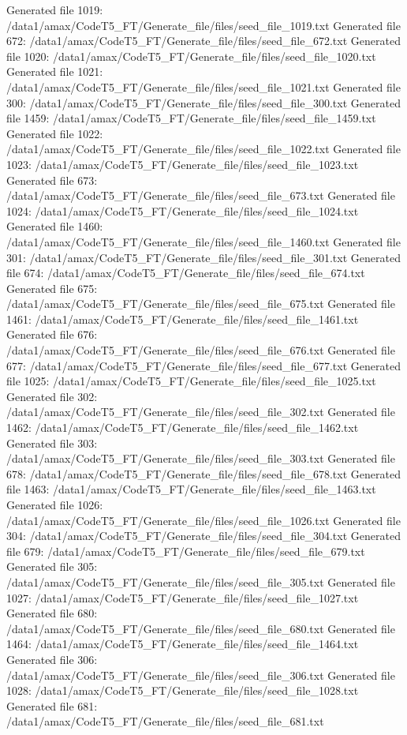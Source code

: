 Generated file 1019: /data1/amax/CodeT5_FT/Generate_file/files/seed_file_1019.txt
Generated file 672: /data1/amax/CodeT5_FT/Generate_file/files/seed_file_672.txt
Generated file 1020: /data1/amax/CodeT5_FT/Generate_file/files/seed_file_1020.txt
Generated file 1021: /data1/amax/CodeT5_FT/Generate_file/files/seed_file_1021.txt
Generated file 300: /data1/amax/CodeT5_FT/Generate_file/files/seed_file_300.txt
Generated file 1459: /data1/amax/CodeT5_FT/Generate_file/files/seed_file_1459.txt
Generated file 1022: /data1/amax/CodeT5_FT/Generate_file/files/seed_file_1022.txt
Generated file 1023: /data1/amax/CodeT5_FT/Generate_file/files/seed_file_1023.txt
Generated file 673: /data1/amax/CodeT5_FT/Generate_file/files/seed_file_673.txt
Generated file 1024: /data1/amax/CodeT5_FT/Generate_file/files/seed_file_1024.txt
Generated file 1460: /data1/amax/CodeT5_FT/Generate_file/files/seed_file_1460.txt
Generated file 301: /data1/amax/CodeT5_FT/Generate_file/files/seed_file_301.txt
Generated file 674: /data1/amax/CodeT5_FT/Generate_file/files/seed_file_674.txt
Generated file 675: /data1/amax/CodeT5_FT/Generate_file/files/seed_file_675.txt
Generated file 1461: /data1/amax/CodeT5_FT/Generate_file/files/seed_file_1461.txt
Generated file 676: /data1/amax/CodeT5_FT/Generate_file/files/seed_file_676.txt
Generated file 677: /data1/amax/CodeT5_FT/Generate_file/files/seed_file_677.txt
Generated file 1025: /data1/amax/CodeT5_FT/Generate_file/files/seed_file_1025.txt
Generated file 302: /data1/amax/CodeT5_FT/Generate_file/files/seed_file_302.txt
Generated file 1462: /data1/amax/CodeT5_FT/Generate_file/files/seed_file_1462.txt
Generated file 303: /data1/amax/CodeT5_FT/Generate_file/files/seed_file_303.txt
Generated file 678: /data1/amax/CodeT5_FT/Generate_file/files/seed_file_678.txt
Generated file 1463: /data1/amax/CodeT5_FT/Generate_file/files/seed_file_1463.txt
Generated file 1026: /data1/amax/CodeT5_FT/Generate_file/files/seed_file_1026.txt
Generated file 304: /data1/amax/CodeT5_FT/Generate_file/files/seed_file_304.txt
Generated file 679: /data1/amax/CodeT5_FT/Generate_file/files/seed_file_679.txt
Generated file 305: /data1/amax/CodeT5_FT/Generate_file/files/seed_file_305.txt
Generated file 1027: /data1/amax/CodeT5_FT/Generate_file/files/seed_file_1027.txt
Generated file 680: /data1/amax/CodeT5_FT/Generate_file/files/seed_file_680.txt
Generated file 1464: /data1/amax/CodeT5_FT/Generate_file/files/seed_file_1464.txt
Generated file 306: /data1/amax/CodeT5_FT/Generate_file/files/seed_file_306.txt
Generated file 1028: /data1/amax/CodeT5_FT/Generate_file/files/seed_file_1028.txt
Generated file 681: /data1/amax/CodeT5_FT/Generate_file/files/seed_file_681.txt
